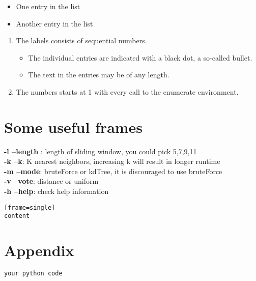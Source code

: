\documentclass{article}
\begin{document}
\begin{itemize}
  \item One entry in the list
  \item Another entry in the list
\end{itemize}

\begin{enumerate}
   \item The labels consists of sequential numbers.
   \begin{itemize}
     \item The individual entries are indicated with a black dot, a so-called bullet.
     \item The text in the entries may be of any length.
   \end{itemize}
   \item The numbers starts at 1 with every call to the enumerate environment.
\end{enumerate}


\section{Some useful frames}
\begin{mdframed}[backgroundcolor=black!10]
\textbf{-l --length} : length of sliding window, you could pick 5,7,9,11 \\
\textbf{-k --k}: K nearest neighbors, increasing k will result in longer runtime \\
\textbf{-m --mode}: bruteForce or kdTree, it is discouraged to use bruteForce \\
\textbf{-v --vote}: distance or uniform \\
\textbf{-h --help}: check help information 
\end{mdframed}

\begin{verbatim}[frame=single]
content
\end{verbatim}


\section{Appendix}
\begin{lstlisting}[language=Python, caption=Python Code]
your python code
\end{lstlisting}




\section{}
\end{document}
